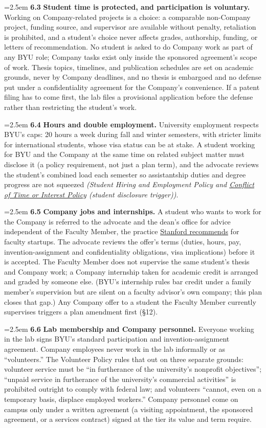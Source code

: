 \documentclass[11pt]{article}
\newcommand{\clause}[1]{%
  \par\addvspace{5pt plus 1pt}%
  \noindent\hangindent=2.5em\hangafter=1
  {\color{byunavy}\bfseries #1}\hspace{0.7em}\ignorespaces}
\newcommand{\policyref}[1]{{\small\itshape(#1)}}
\begin{document}
\clause{6.3} \textbf{Student time is protected, and participation is
voluntary.} Working on Company-related projects is a choice: a comparable
non-Company project, funding source, and supervisor are available without
penalty, retaliation is prohibited, and a student's choice never affects
grades, authorship, funding, or letters of recommendation. No student is
asked to do Company work as part of any BYU role; Company tasks exist only
inside the sponsored agreement's scope of work. Thesis topics, timelines, and
publication schedules are set on academic grounds, never by Company
deadlines, and no thesis is embargoed and no defense put under a
confidentiality agreement for the Company's convenience. If a patent filing has to come first, the lab files a provisional
application before the defense rather than restricting the student's work.

\clause{6.4} \textbf{Hours and double employment.} University employment respects BYU's caps: 20 hours a week during fall
and winter semesters,
with stricter limits for international students, whose visa status can be at
stake. A student working for BYU and the Company at the same time on related
subject matter must disclose it (a policy requirement, not just a plan term),
and the advocate reviews the student's combined load each semester so
assistantship duties and degree progress are not squeezed
\policyref{Student Hiring and Employment Policy and
\href{https://policy.byu.edu/view/conflict-of-time-or-interest-policy}{Conflict
of Time or Interest Policy} (student disclosure trigger)}.

\clause{6.5} \textbf{Company jobs and internships.} A student who wants to
work for the Company is referred to the advocate and the dean's office for advice independent of the Faculty Member, the practice
\href{https://web.stanford.edu/group/OTL/documents/bp_faculty_sus.pdf}{Stanford
recommends} for faculty startups. The advocate reviews the offer's terms (duties, hours, pay, invention-assignment and confidentiality
obligations, visa implications) before it is accepted. The Faculty Member
does not supervise the
same student's thesis and Company work; a Company internship taken for
academic credit is arranged and graded by someone else. (BYU's internship
rules bar credit under a family member's supervision but are silent on a
faculty advisor's own company; this plan closes that gap.) Any Company offer
to a student the Faculty Member currently supervises triggers a plan
amendment first (\S12).

\clause{6.6} \textbf{Lab membership and Company personnel.} Everyone working
in the lab signs BYU's standard participation and invention-assignment
agreement. Company employees never work in the lab informally or as
``volunteers.'' The Volunteer Policy rules that out on three separate grounds:
volunteer service must be ``in furtherance of the university's nonprofit
objectives''; ``unpaid service in furtherance of the university's commercial
activities'' is prohibited outright to comply with federal law; and
volunteers ``cannot, even on a temporary basis, displace employed workers.''
Company personnel come on campus only under a written agreement (a
visiting appointment, the sponsored agreement, or a services contract) signed
at the tier its value and term require.
\end{document}
